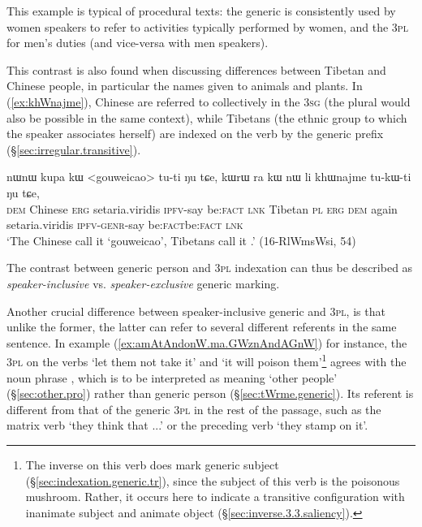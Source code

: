 This example is typical of procedural texts: the generic is consistently used by women speakers to refer to activities typically performed by women, and the \textsc{3pl} for men's duties (and vice-versa with men speakers). 

This contrast is also found when discussing differences between Tibetan and Chinese people, in particular the names given to animals and plants. In (\ref{ex:khWnajme}), Chinese are referred to collectively in the \textsc{3sg} (the plural would also be possible in the same context), while Tibetans (the ethnic group to which the speaker associates herself) are indexed on the verb by the generic  prefix (§\ref{sec:irregular.transitive}).

\begin{exe}
\ex \label{ex:khWnajme}
\gll nɯnɯ kupa kɯ <gouweicao> tu-ti ŋu tɕe, kɯrɯ ra kɯ nɯ li khɯnajme tu-kɯ-ti ŋu tɕe, \\
\textsc{dem} Chinese \textsc{erg} setaria.viridis \textsc{ipfv}-say be:\textsc{fact} \textsc{lnk}  Tibetan \textsc{pl} \textsc{erg} \textsc{dem} again setaria.viridis \textsc{ipfv}-\textsc{genr}-say be:\textsc{fact}be:\textsc{fact} \textsc{lnk}  \\
\glt `The Chinese call it `gouweicao', Tibetans call it .' (16-RlWmsWsi, 54)
\end{exe}

The contrast between  generic person and \textsc{3pl} indexation can thus be described as \textit{speaker-inclusive} vs. \textit{speaker-exclusive} generic marking.

Another crucial difference between speaker-inclusive generic and \textsc{3pl}, is that unlike the former, the latter can refer to several different referents in the same sentence. In example (\ref{ex:amAtAndonW.ma.GWznAndAGnW}) for instance, the \textsc{3pl} on the verbs  `let them not take it' and  `it will poison them'\footnote{The inverse on this verb does mark generic subject (§\ref{sec:indexation.generic.tr}), since the subject of this verb is the poisonous mushroom. Rather, it occurs here to indicate a transitive configuration with inanimate subject and animate object (§\ref{sec:inverse.3.3.saliency}).} agrees with the noun phrase , which is to be interpreted as meaning `other people' (§\ref{sec:other.pro}) rather than generic person (§\ref{sec:tWrme.generic}). Its referent is different from that of the generic \textsc{3pl} in the rest of the passage, such as the matrix verb  `they think that ...' or the preceding verb  `they stamp on it'.

